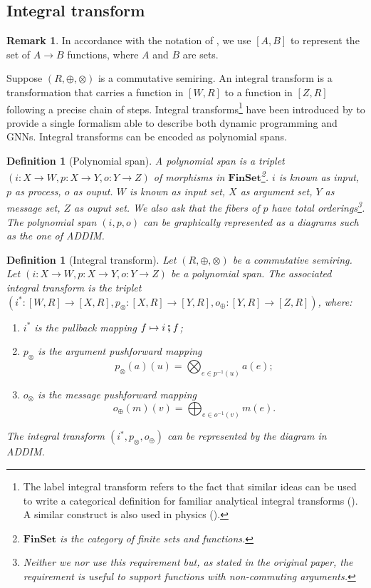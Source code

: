 \documentclass[11pt,a4paper,openright,twoside]{report}
\theoremstyle{plain}
\newtheorem{definition}[proposition]{Definition}
\theoremstyle{definition}
\newtheorem{remark}[proposition]{Remark}
\begin{document}
\subsection{Integral transform}

\begin{remark}
  In accordance with the notation of \cite{dudzik2022graph}, we use $[A,B]$ to represent the set of $A \to B$ functions, where $A$ and $B$ are sets.
\end{remark}

Suppose $(R, \oplus, \otimes)$ is a commutative semiring. An integral transform is a transformation that carries a function in $[W,R]$ to a function in $[Z,R]$ following a precise chain of steps. Integral transforms\footnote{The label integral transform refers to the fact that similar ideas can be used to write a categorical definition for familiar analytical integral transforms (\cite{golem_ph_utexas_edu}). A similar construct is also used in physics (\cite{eastwood1980cohomology}).} have been introduced by \cite{dudzik2022graph} to provide a single formalism able to describe both dynamic programming and GNNs. Integral transforms can be encoded as polynomial spans.

\begin{definition}[Polynomial span]
  A polynomial span is a triplet $(i: X \to W,p: X \to Y,o: Y \to Z)$ of morphisms in $\mathbf{FinSet}$\footnote{$\mathbf{FinSet}$ is the category of finite sets and functions.}. $i$ is known as input, $p$ as process, $o$ as ouput. $W$ is known as input set, $X$ as argument set, $Y$ as message set, $Z$ as ouput set. We also ask that the fibers of $p$ have total orderings\footnote{Neither we nor \cite{dudzik2022graph} use this requirement but, as stated in the original paper, the requirement is useful to support functions with non-commuting arguments.}. The polynomial span $(i,p,o)$ can be graphically represented as a diagrams such as the one of ADDIM.
\end{definition}

\begin{definition}[Integral transform]
  Let $(R, \oplus, \otimes)$ be a commutative semiring. Let $(i: X \to W,p: X \to Y,o: Y \to Z)$ be a polynomial span. The associated integral transform is the triplet $(i^*: [W,R] \to [X,R], p_{\otimes}: [X,R] \to [Y,R], o_{\oplus}: [Y,R] \to [Z,R])$, where:
  \begin{enumerate}
    \item $i^*$ is the pullback mapping $f \mapsto i \fatsemi f$;
    \item $p_{\otimes}$ is the argument pushforward mapping 
    \[p_{\otimes}(a)(u) = \bigotimes_{e \in p^{-1}(u)}a(e);\]
    \item $o_{\otimes}$ is the message pushforward mapping 
    \[o_{\oplus}(m)(v) = \bigoplus_{e \in o^{-1}(v)}m(e).\]
  \end{enumerate}
  The integral transform $(i^*, p_{\otimes}, o_{\oplus})$ can be represented by the diagram in ADDIM.
\end{definition}
\end{document}
